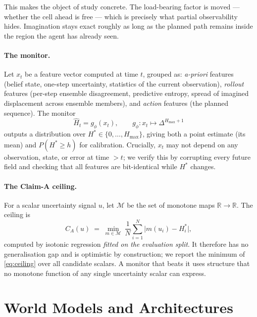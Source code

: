 \documentclass[twocolumn,10pt]{article}
\newcommand{\Hstar}{H^{*}}
\newcommand{\Hhat}{\hat{H}}
\newcommand{\gphi}{g_{\phi}}
\begin{document}
This makes the object of study concrete. The load-bearing factor is $\mathrm{moved}$ --- whether
the cell ahead is free --- which is precisely what partial observability hides. Imagination
stays exact roughly as long as the planned path remains inside the region the agent has already
seen.

\paragraph{The monitor.}
Let $x_t$ be a feature vector computed at time $t$, grouped as: \emph{a-priori} features
(belief state, one-step uncertainty, statistics of the current observation), \emph{rollout}
features (per-step ensemble disagreement, predictive entropy, spread of imagined displacement
across ensemble members), and \emph{action} features (the planned sequence). The monitor
\begin{equation}
\Hhat_t = \gphi(x_t), \qquad \gphi: x_t \mapsto \Delta^{H_{\max}+1}
\end{equation}
outputs a distribution over $\Hstar \in \{0,\dots,H_{\max}\}$, giving both a point estimate
(its mean) and $P(\Hstar \ge h)$ for calibration. Crucially, $x_t$ may not depend on any
observation, state, or error at time $>t$; we verify this by corrupting every future field and
checking that all features are bit-identical while $\Hstar$ changes.

\paragraph{The Claim-A ceiling.}
For a scalar uncertainty signal $u$, let $\mathcal{M}$ be the set of monotone maps
$\mathbb{R}\to\mathbb{R}$. The ceiling is
\begin{equation}
C_A(u) \;=\; \min_{m \in \mathcal{M}} \ \frac{1}{N}\sum_{i=1}^{N} \big| m(u_i) - \Hstar_i \big|,
\label{eq:ceiling}
\end{equation}
computed by isotonic regression \emph{fitted on the evaluation split}. It therefore has no
generalisation gap and is optimistic by construction; we report the minimum of
\eqref{eq:ceiling} over all candidate scalars. A monitor that beats it uses structure that no
monotone function of any single uncertainty scalar can express.

\section{World Models and Architectures}
\label{sec:wm}
\end{document}
